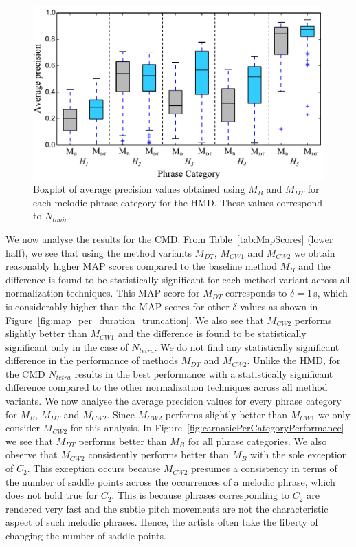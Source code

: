 \begin{figure}
	\begin{center}
		\includegraphics[width=\figSizeEightyFive]{ch06_patterns/figures/ImprovingSimilarity/HindustaniPerCategoryPerformance_BOXPLOT.pdf}
	\end{center}
	\caption{Boxplot of average precision values obtained using $M_{B}$ and $M_{DT}$ for each melodic phrase category for the HMD. These values correspond to $N_{tonic}$.} 
	\label{fig:hinudstaniPerCategoryPerformance}
\end{figure}


We now analyse the results for the CMD. From Table~\ref{tab:MapScores} (lower half), we see that using the method variants $M_{DT}$, $M_{CW1}$ and $M_{CW2}$ we obtain reasonably higher MAP scores compared to the baseline method $M_{B}$ and the difference is found to be statistically significant for each method variant across all normalization techniques. This MAP score for $M_{DT}$ corresponds to $\delta=$1\,s, which is considerably higher than the MAP scores for other $\delta$ values as shown in Figure~\ref{fig:map_per_duration_truncation}. We also see that $M_{CW2}$ performs slightly better than $M_{CW1}$ and the difference is found to be statistically significant only in the case of $N_{tetra}$. We do not find any statistically significant difference in the performance of methods $M_{DT}$ and $M_{CW2}$. Unlike the HMD, for the CMD $N_{tetra}$ results in the best performance with a statistically significant difference compared to the other normalization techniques across all method variants. We now analyse the average precision values for every phrase category for $M_B$, $M_{DT}$ and $M_{CW2}$. Since $M_{CW2}$ performs slightly better than $M_{CW1}$ we only consider $M_{CW2}$ for this analysis. In Figure~\ref{fig:carnaticPerCategoryPerformance} we see that $M_{DT}$ performs better than $M_B$ for all phrase categories.  We also observe that $M_{CW2}$ consistently performs better than $M_{B}$ with the sole exception of $C_2$. This exception occurs because $M_{CW2}$ presumes a consistency in terms of the number of saddle points across the occurrences of a melodic phrase, which does not hold true for $C_2$. This is because phrases corresponding to $C_2$ are rendered very fast and the subtle pitch movements are not the characteristic aspect of such melodic phrases. Hence, the artists often take the liberty of changing the number of saddle points. 

